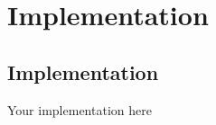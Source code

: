 \if{}
\chapter{Implementation}
\else
\section{Implementation}  
\fi
\label{sec:implementation}

Your implementation here